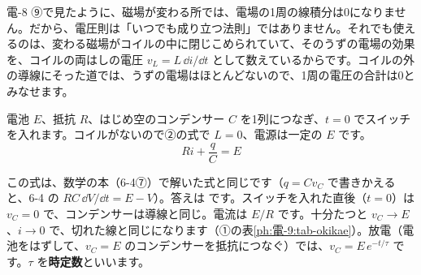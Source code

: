 電-8 ⑨で見たように、磁場が変わる所では、電場の1周の線積分は0になりません。だから、電圧則は「いつでも成り立つ法則」ではありません。それでも使えるのは、変わる磁場がコイルの中に閉じこめられていて、そのうずの電場の効果を、コイルの両はしの電圧 $v_L=L\,\dd i/\dd t$ として数えているからです。コイルの外の導線にそった道では、うずの電場はほとんどないので、1周の電圧の合計は0とみなせます。

\begin{phmodel}[集中定数の回路]
\end{phmodel}

\label{ph:電-9:sec3}
\noindent\begin{minipage}[c]{0.36\linewidth}\centering
{}
\label{ph:電-9:fig-rc}
\end{minipage}\hfill
\begin{minipage}[c]{0.61\linewidth}\raggedright
電池 $E$、抵抗 $R$、はじめ空のコンデンサー $C$ を1列につなぎ、$t=0$ でスイッチを入れます。コイルがないので②の式で $L=0$、電源は一定の $E$ です。
\[ Ri+\frac{q}{C}=E \]
\end{minipage}
\par\vspace{3pt}
この式は、数学の本（6-4⑦）で解いた式と同じです（$q=Cv_C$ で書きかえると、6-4 の $RC\,\dd V/\dd t=E-V$）。答えは
です。スイッチを入れた直後（$t=0$）は $v_C=0$ で、コンデンサーは導線と同じ。電流は $E/R$ です。十分たつと $v_C\to E$、$i\to0$ で、切れた線と同じになります（①の表\ref{ph:電-9:tab-okikae}）。放電（電池をはずして、$v_C=E$ のコンデンサーを抵抗につなぐ）では、$v_C=E\,e^{-t/\tau}$ です。$\tau$ を\textbf{時定数}といいます。

